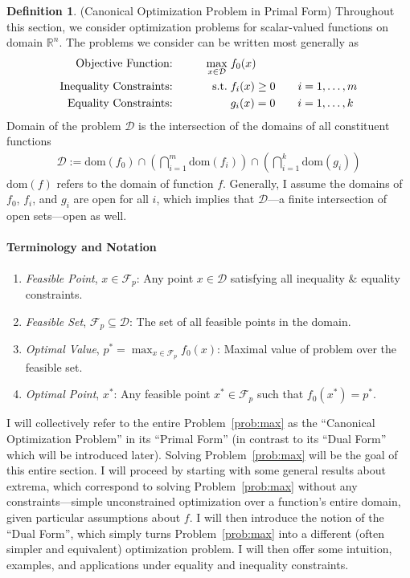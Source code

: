 \documentclass[12pt]{book}
\numberwithin{equation}{section} %
\theoremstyle{plain}
\theoremstyle{definition}
\newtheorem{defn}[thm]{Definition}
\theoremstyle{remark}
\newcommand{\dom}{\text{dom}}
\newcommand{\calD}{\mathcal{D}}
\newcommand{\Rn}{\mathbb{R}^n}
\begin{document}
\begin{defn}(Canonical Optimization Problem in Primal Form)
Throughout this section, we consider optimization problems for
scalar-valued functions on domain $\Rn$. The problems we consider can be
written most generally as
\begin{alignat}{3}
  \text{Objective Function:} \qquad
    && \max_{x\in\mathcal{D}} \; &f_0(x) \label{prob:max}\\
  \text{Inequality Constraints:} \qquad
    && \text{s.t.} \; &f_i(x) \geq 0 \qquad i = 1,\ldots, m\notag \\
  \text{Equality Constraints:} \qquad
    && &g_i(x) = 0 \qquad i = 1,\ldots,k\notag
\end{alignat}
Domain of the problem $\mathcal{D}$ is the intersection of the domains
of all constituent functions
\begin{align*}
  \mathcal{D} := \dom(f_0)
  \cap \left( \bigcap^m_{i=1} \dom(f_i)\right)
  \cap \left( \bigcap^k_{i=1} \dom(g_i)\right)
\end{align*}
$\dom(f)$ refers to the domain of function $f$. Generally, I
assume the domains of $f_0$, $f_i$, and $g_i$ are open for all $i$,
which implies that $\mathcal{D}$---a finite intersection of open
sets---open as well.

\paragraph{Terminology and Notation}
\begin{enumerate}
  \item \emph{Feasible Point}, $x\in\mathscr{F}_p$: Any point
    $x\in\mathcal{D}$ satisfying all inequality \& equality
    constraints.
  \item \emph{Feasible Set}, $\mathscr{F}_p\subseteq\calD$:
    The set of all feasible points in the domain.
  \item \emph{Optimal Value}, $p^*=\max_{x\in \mathscr{F}_p} f_0(x)$:
    Maximal value of problem over the feasible set.
  \item \emph{Optimal Point}, $x^*$: Any feasible point
    $x^*\in\mathscr{F}_p$ such that $f_0(x^*)=p^*$.
\end{enumerate}
I will collectively refer to the entire Problem~\ref{prob:max} as the
``Canonical Optimization Problem'' in its ``Primal Form'' (in contrast
to its ``Dual Form'' which will be introduced later). Solving
Problem~\ref{prob:max} will be the goal of this entire section. I will
proceed by starting with some general results about extrema, which
correspond to solving Problem~\ref{prob:max} without any
constraints---simple unconstrained optimization over a function's entire
domain, given particular assumptions about $f$. I will then introduce
the notion of the ``Dual Form'', which simply turns
Problem~\ref{prob:max} into a different (often simpler and equivalent)
optimization problem. I will then offer some intuition, examples, and
applications under equality and inequality constraints.
\end{defn}
\end{document}
